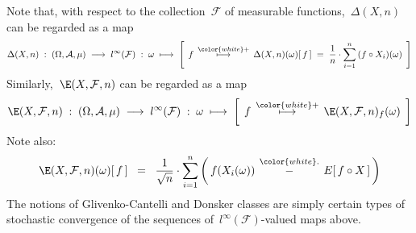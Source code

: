 
\begin{remark}\mbox{}
\vskip 0.1cm
\noindent
Note that, with respect to the collection \,$\mathcal{F}$ of measurable functions,
\,$\Delta(X,n)$\, can be regarded as a map
\begin{equation*}
\Delta(X,n) \; : \; (\Omega,\mathcal{A},\mu) \;\longrightarrow\; l^{\infty}(\mathcal{F})
\; : \; \omega \;\longmapsto\;
	\left[\;\,
	f
	\,\overset{{\color{white}+}}{\longmapsto}\,
		\Delta(X,n)(\omega)[\,f\,]
		\;=\; \dfrac{1}{n}\cdot \overset{n}{\underset{i=1}{\sum}}\,(f \circ X_{i})(\omega)
	\,\;\right]
\end{equation*}
Similarly, \,$\E(X,\mathcal{F},n)$ can be regarded as a map
\begin{equation*}
\E(X,\mathcal{F},n) \; : \; (\Omega,\mathcal{A},\mu) \;\longrightarrow\; l^{\infty}(\mathcal{F})
\; : \; \omega \;\longmapsto\; \left[\;\, f \,\overset{{\color{white}+}}{\longmapsto}\, \E(X,\mathcal{F},n)_{f}(\omega) \,\;\right]
\end{equation*}
Note also:
\begin{equation*}
\E(X,\mathcal{F},n)(\omega)[\,f\,]
\;\; = \;\;
	 \dfrac{1}{\sqrt{n}}
	 \cdot
	 \overset{n}{\underset{i=1}{\sum}}\left(\,f(X_{i}(\omega)) \,\overset{{\color{white}.}}{-}\, E[\,f \circ X\,]\,\right)
\end{equation*}
The notions of Glivenko-Cantelli and Donsker classes are simply certain types
of stochastic convergence of the sequences of \,$l^{\infty}(\mathcal{F})$-valued maps above.
\end{remark}


